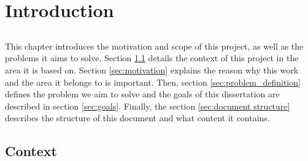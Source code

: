 \chapter{Introduction} \label{chap:intro} \minitoc

\section*{}

This chapter introduces the motivation and scope of this project, as well as the problems it aims to solve. Section \ref{sec:context} details the context of this project in the area it is based on. Section \ref{sec:motivation} explains the reason why this work and the area it belongs to is important. Then, section \ref{sec:problem_definition} defines the problem we aim to solve and the goals of this dissertation are described in section \ref{sec:goals}. Finally, the section \ref{sec:document structure} describes the structure of this document and what content it contains.

\section{Context} \label{sec:context}


